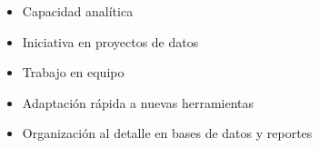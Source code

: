 
\twocolumnsection
{
	\begin{skills}
	\end{skills}}
{
	\vspace{1em}
	\begin{itemize}
		\item Capacidad analítica
		\item Iniciativa en proyectos de datos
		\item Trabajo en equipo
		\item Adaptación rápida a nuevas herramientas
		\item Organización al detalle en bases de datos y reportes
	\end{itemize}
}



		

